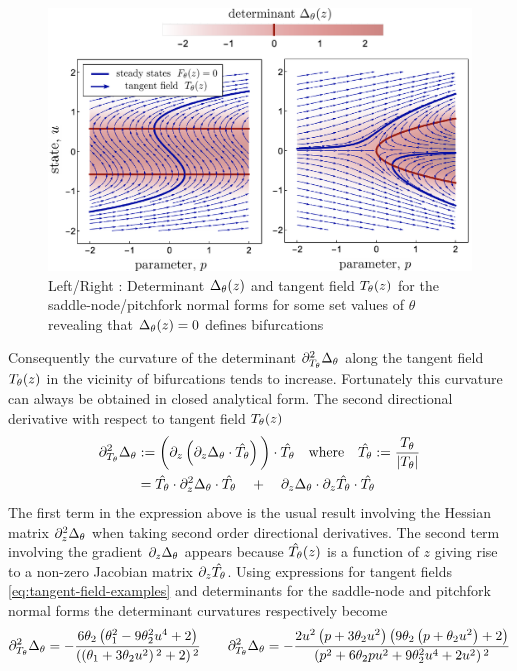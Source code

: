 \begin{figure}[H]
\centering{}
\captionsetup{justification=centering}
\includegraphics[width=14cm]{docs/figures/determinant-curvature}
\caption{Left/Right : Determinant $\Delta_{\theta}(z)$ and tangent field $T_{\theta}(z)$ for the saddle-node/pitchfork normal forms for some set values of $\theta$ revealing that $\Delta_{\theta}(z)=0$ defines bifurcations}
\label{fig:determinant-curvature}
\end{figure}

Consequently the curvature of the determinant $\partial_{T_{\theta}}^2\Delta_{\theta}$ along the tangent field $T_{\theta}(z)$ in the vicinity of bifurcations tends to increase. Fortunately this curvature can always be obtained in closed analytical form. The second directional derivative with respect to tangent field $T_{\theta}(z)$
\begin{align}
    \partial_{T_{\theta}}^2\Delta_{\theta} &:=
    \bigg(
        \partial_z\left(
            \partial_z\Delta_{\theta} \cdot \hat{T_{\theta}}
        \right)
    \bigg)\cdot \hat{T_{\theta}}\quad
    \mathrm{where} \quad \hat{T_{\theta}}:=\frac{T_{\theta}}{|T_{\theta}|}\\
    &=
    \hat{T_{\theta}}\cdot\partial_z^2\Delta_{\theta}\cdot\hat{T_{\theta}}
    \quad+\quad
    \partial_z\Delta_{\theta}\cdot\partial_z\hat{T_{\theta}}\cdot\hat{T_{\theta}}
\end{align}
The first term in the expression above is the usual result involving the Hessian matrix $\partial_z^2\Delta_{\theta}$ when taking second order directional derivatives. The second term involving the gradient $\partial_z\Delta_{\theta}$ appears because $\hat{T_{\theta}}(z)$ is a function of $z$ giving rise to a non-zero Jacobian matrix $\partial_z \hat{T_{\theta}}$. Using expressions for tangent fields \eqref{eq:tangent-field-examples} and determinants for the saddle-node and pitchfork normal forms the determinant curvatures respectively become
\begin{align}
    \partial_{T_{\theta}}^2\Delta_{\theta} = 
    -\frac{6 \theta_2 \left(\theta _1^2-9 \theta _2^2 u^4+2\right)}
    {\left(\left(\theta _1+3 \theta _2 u^2\right){}^2+2\right){}^2}
    \qquad
    \partial_{T_{\theta}}^2\Delta_{\theta} =
    -\frac{2 u^2 \left(p+3 \theta _2 u^2\right) \left(9 \theta _2 \left(p+\theta _2 u^2\right)+2\right)}{\left(p^2+6 \theta _2 p u^2+9 \theta _2^2 u^4+2 u^2\right){}^2}
\end{align}
